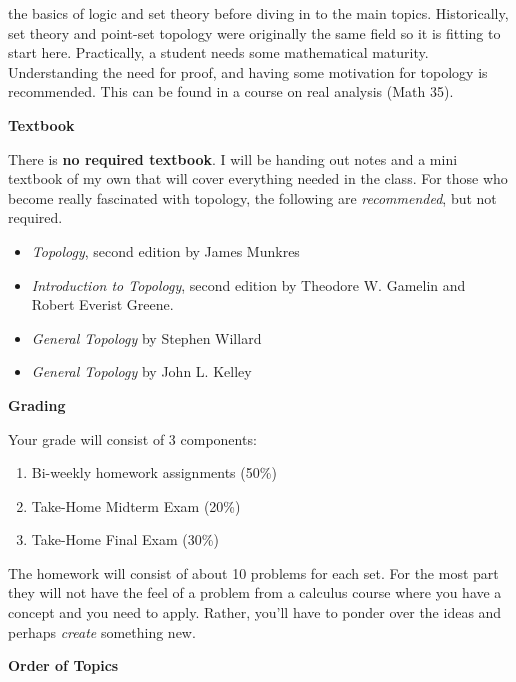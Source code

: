 \documentclass{article}
\begin{document}
    the basics of logic and set theory before diving in to the main topics.
    Historically, set theory and point-set topology were originally the same
    field so it is fitting to start here. Practically, a student needs some
    mathematical maturity. Understanding the need for proof, and having some
    motivation for topology is recommended. This can be found in a course on
    real analysis (Math 35).
    \par\hfill\par
    \textbf{Textbook}
    \par\hfill\par
    There is \textbf{no required textbook}. I will be handing out notes and a
    mini textbook of my own that will cover everything needed in the class.
    For those who become really fascinated with topology, the following are
    \textit{recommended}, but not required.
    \begin{itemize}
        \item \textit{Topology}, second edition by James Munkres
        \item \textit{Introduction to Topology}, second edition
            by Theodore W. Gamelin and Robert Everist Greene.
        \item \textit{General Topology} by Stephen Willard
        \item \textit{General Topology} by John L. Kelley
    \end{itemize}
    \par\hfill\par
    \textbf{Grading}
    \par\hfill\par
    Your grade will consist of 3 components:
    \begin{enumerate}
        \item Bi-weekly homework assignments (50\%)
        \item Take-Home Midterm Exam (20\%)
        \item Take-Home Final Exam (30\%)
    \end{enumerate}
    The homework will consist of about 10 problems for each set. For the most
    part they will not have the feel of a problem from a calculus course where
    you have a concept and you need to apply. Rather, you'll have to ponder
    over the ideas and perhaps \textit{create} something new.
    \par\hfill\par
    \textbf{Order of Topics}
    \par\hfill\par
\end{document}

